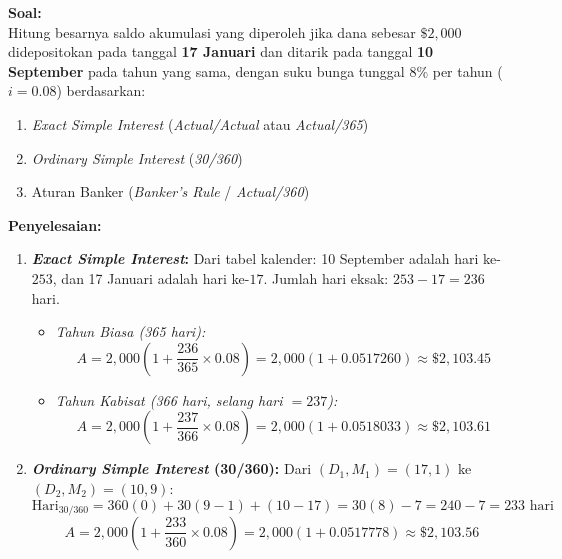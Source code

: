 \documentclass[11pt,a4paper]{article}
\begin{document}
\begin{examplebox}
\textbf{Soal:}\\
Hitung besarnya saldo akumulasi yang diperoleh jika dana sebesar $\$2{,}000$ didepositokan pada tanggal \textbf{17 Januari} dan ditarik pada tanggal \textbf{10 September} pada tahun yang sama, dengan suku bunga tunggal $8\%$ per tahun ($i = 0.08$) berdasarkan:
\begin{enumerate}[label=(\alph*)]
    \item \textit{Exact Simple Interest} (\textit{Actual/Actual} atau \textit{Actual/365})
    \item \textit{Ordinary Simple Interest} (\textit{30/360})
    \item Aturan Banker (\textit{Banker's Rule} / \textit{Actual/360})
\end{enumerate}

\vspace{0.5em}
\textbf{Penyelesaian:}\\
\begin{enumerate}[label=(\alph*)]
    \item \textbf{\textit{Exact Simple Interest}:}
    Dari tabel kalender: 10 September adalah hari ke-$253$, dan 17 Januari adalah hari ke-$17$.
    Jumlah hari eksak: $253 - 17 = 236$ hari.
    \begin{itemize}
        \item \emph{Tahun Biasa (365 hari):}
        \begin{equation*}
            A = 2{,}000 \left( 1 + \frac{236}{365} \times 0.08 \right) = 2{,}000 (1 + 0.0517260) \approx \$2{,}103.45
        \end{equation*}
        \item \emph{Tahun Kabisat (366 hari, selang hari $= 237$):}
        \begin{equation*}
            A = 2{,}000 \left( 1 + \frac{237}{366} \times 0.08 \right) = 2{,}000 (1 + 0.0518033) \approx \$2{,}103.61
        \end{equation*}
    \end{itemize}

    \item \textbf{\textit{Ordinary Simple Interest} (30/360):}
    Dari $(D_1, M_1) = (17, 1)$ ke $(D_2, M_2) = (10, 9)$:
    \begin{equation*}
        \text{Hari}_{30/360} = 360(0) + 30(9 - 1) + (10 - 17) = 30(8) - 7 = 240 - 7 = 233 \text{ hari}
    \end{equation*}
    \begin{equation*}
        A = 2{,}000 \left( 1 + \frac{233}{360} \times 0.08 \right) = 2{,}000 (1 + 0.0517778) \approx \$2{,}103.56
    \end{equation*}


\end{enumerate}
\end{examplebox}
\end{document}
